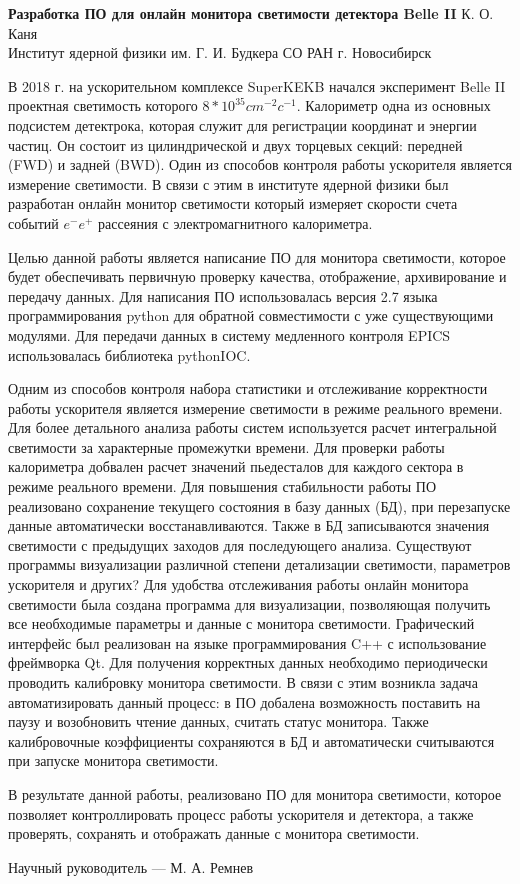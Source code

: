 \documentclass[12pt,a4paper]{scrartcl}
\begin{document}
    \begin{center}
        \textbf{Разработка ПО для онлайн монитора светимости детектора Belle II}
        \bigbreak
        К. О. Каня \\
        Институт ядерной физики им. Г. И. Будкера СО РАН г. Новосибирск
    \end{center}

    В 2018 г. на ускорительном комплексе SuperKEKB начался эксперимент Belle II проектная светимость которого $8 * 10^{35} cm^{-2} c^{-1}$. Калориметр одна из основных подсистем детектрока, которая служит для регистрации координат и энергии частиц. Он состоит из цилиндрической и двух торцевых секций: передней (FWD) и задней (BWD). Один из способов контроля работы ускорителя является измерение светимости. В связи с этим в институте ядерной физики был разработан онлайн монитор светимости который измеряет скорости счета событий $e^-e^+$ рассеяния с электромагнитного калориметра. \par
    Целью данной работы является написание ПО для монитора светимости, которое будет обеспечивать первичную проверку качества, отображение, архивирование и передачу данных. Для написания ПО использовалась версия 2.7 языка программирования python для обратной совместимости с уже существующими модулями. Для передачи данных в систему медленного контроля EPICS использовалась библиотека pythonIOC. \par
    Одним из способов контроля набора статистики и отслеживание корректности работы ускорителя является измерение светимости в режиме реального времени. Для более детального анализа работы систем используется расчет интегральной светимости за характерные промежутки времени. Для проверки работы калориметра добвален расчет значений пьедесталов для каждого сектора в режиме реального времени. Для повышения стабильности работы ПО реализовано сохранение текущего состояния в базу данных (БД), при перезапуске данные автоматически восстанавливаются. Также в БД записываются значения светимости с предыдущих заходов для последующего анализа. Существуют программы визуализации различной степени детализации светимости, параметров ускорителя и других? Для удобства отслеживания работы онлайн монитора светимости была создана программа для визуализации, позволяющая получить все необходимые параметры и данные с монитора светимости. Графический интерфейс был реализован на языке программирования C++ с использование фреймворка Qt. Для получения корректных данных необходимо периодически проводить калибровку монитора светимости. В связи с этим возникла задача автоматизировать данный процесс: в ПО добалена возможность поставить на паузу и возобновить чтение данных, считать статус монитора. Также калибровочные коэффициенты сохраняются в БД и автоматически считываются при запуске монитора светимости. \par
    В результате данной работы, реализовано ПО для монитора светимости, которое позволяет контроллировать процесс работы ускорителя и детектора, а также проверять, сохранять и отображать данные с монитора светимости.
\bigbreak
\begin{center}
    Научный руководитель --- М. А. Ремнев
\end{center} 
\end{document}
